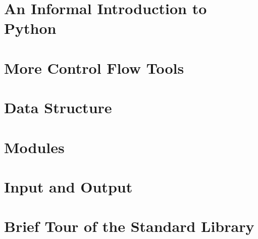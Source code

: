 \documentclass{lincolncsuthesis}
\begin{document}



\thesisTables
\thesisBodyStart





\chapter{An Informal Introduction to Python}


\chapter{More Control Flow Tools}


\chapter{Data Structure}


\chapter{Modules}


\chapter{Input and Output}


\chapter{Brief Tour of the Standard Library}






\end{document}
